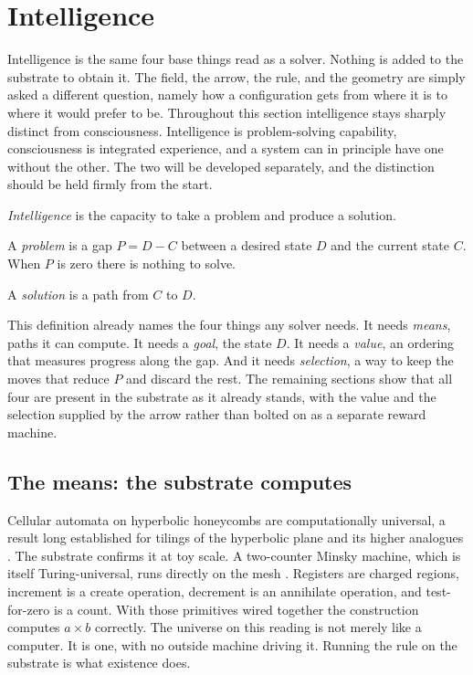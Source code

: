 \section{Intelligence}

Intelligence is the same four base things read as a solver. Nothing is added to the substrate to obtain it. The
field, the arrow, the rule, and the geometry are simply asked a different question, namely how a configuration
gets from where it is to where it would prefer to be. Throughout this section intelligence stays sharply distinct
from consciousness. Intelligence is problem-solving capability, consciousness is integrated experience, and a
system can in principle have one without the other. The two will be developed separately, and the distinction
should be held firmly from the start.

\begin{definition}[Intelligence]
\emph{Intelligence} is the capacity to take a problem and produce a solution.
\end{definition}

\begin{definition}[Problem]
A \emph{problem} is a gap $P = D - C$ between a desired state $D$ and the current state $C$. When $P$ is zero there
is nothing to solve.
\end{definition}

\begin{definition}[Solution]
A \emph{solution} is a path from $C$ to $D$.
\end{definition}

This definition already names the four things any solver needs. It needs \emph{means}, paths it can compute. It
needs a \emph{goal}, the state $D$. It needs a \emph{value}, an ordering that measures progress along the gap. And
it needs \emph{selection}, a way to keep the moves that reduce $P$ and discard the rest. The remaining sections
show that all four are present in the substrate as it already stands, with the value and the selection supplied by
the arrow rather than bolted on as a separate reward machine.

\subsection{The means: the substrate computes}

Cellular automata on hyperbolic honeycombs are computationally universal, a result long established for tilings of
the hyperbolic plane and its higher analogues \cite{margenstern2008, margenstern2013}. The substrate confirms it
at toy scale. A two-counter Minsky machine, which is itself Turing-universal, runs directly on the mesh
\cite{pollard2026vibetest}. Registers are charged regions, increment is a create operation, decrement is an
annihilate operation, and test-for-zero is a count. With those primitives wired together the construction computes
$a \times b$ correctly. The universe on this reading is not merely like a computer. It is one, with no outside
machine driving it. Running the rule on the substrate is what existence does.

